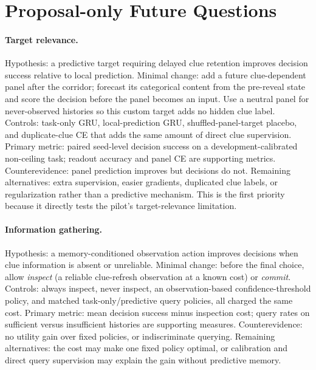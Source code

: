 \documentclass[11pt]{article}
\begin{document}
\section{Proposal-only Future Questions}

\paragraph{Target relevance.} Hypothesis: a predictive target requiring delayed clue retention improves decision success relative to local prediction. Minimal change: add a future clue-dependent panel after the corridor; forecast its categorical content from the pre-reveal state and score the decision before the panel becomes an input. Use a neutral panel for never-observed histories so this custom target adds no hidden clue label. Controls: task-only GRU, local-prediction GRU, shuffled-panel-target placebo, and duplicate-clue CE that adds the same amount of direct clue supervision. Primary metric: paired seed-level decision success on a development-calibrated non-ceiling task; readout accuracy and panel CE are supporting metrics. Counterevidence: panel prediction improves but decisions do not. Remaining alternatives: extra supervision, easier gradients, duplicated clue labels, or regularization rather than a predictive mechanism. This is the first priority because it directly tests the pilot's target-relevance limitation.

\paragraph{Information gathering.} Hypothesis: a memory-conditioned observation action improves decisions when clue information is absent or unreliable. Minimal change: before the final choice, allow \emph{inspect} (a reliable clue-refresh observation at a known cost) or \emph{commit}. Controls: always inspect, never inspect, an observation-based confidence-threshold policy, and matched task-only/predictive query policies, all charged the same cost. Primary metric: mean decision success minus inspection cost; query rates on sufficient versus insufficient histories are supporting measures. Counterevidence: no utility gain over fixed policies, or indiscriminate querying. Remaining alternatives: the cost may make one fixed policy optimal, or calibration and direct query supervision may explain the gain without predictive memory.
\end{document}
